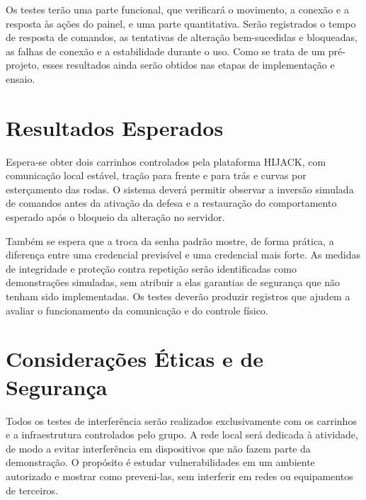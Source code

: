 \documentclass[12pt,a4paper]{article}
\begin{document}
Os testes terão uma parte funcional, que verificará o movimento, a
conexão e a resposta às ações do painel, e uma parte quantitativa. Serão
registrados o tempo de resposta de comandos, as tentativas de alteração
bem-sucedidas e bloqueadas, as falhas de conexão e a estabilidade durante
o uso. Como se trata de um pré-projeto, esses resultados ainda serão
obtidos nas etapas de implementação e ensaio.

\section{Resultados Esperados}
Espera-se obter dois carrinhos controlados pela plataforma HIJACK, com
comunicação local estável, tração para frente e para trás e curvas
por esterçamento das rodas.
O sistema deverá permitir observar a inversão simulada de comandos
antes da ativação da defesa e a restauração do comportamento esperado
após o bloqueio da alteração no servidor.

Também se espera que a troca da senha padrão mostre, de forma prática,
a diferença entre uma credencial previsível e uma credencial mais forte.
As medidas de integridade e proteção contra repetição serão identificadas
como demonstrações simuladas, sem atribuir a elas garantias de segurança
que não tenham sido implementadas. Os testes deverão produzir registros
que ajudem a avaliar o funcionamento da comunicação e do controle físico.

\section{Considerações Éticas e de Segurança}
Todos os testes de interferência serão realizados exclusivamente com os
carrinhos e a infraestrutura controlados pelo grupo. A rede local será dedicada à atividade, de modo a evitar interferência
em dispositivos que não fazem parte da demonstração. O propósito é estudar vulnerabilidades em um ambiente
autorizado e mostrar como preveni-las, sem interferir em redes ou
equipamentos de terceiros.
\end{document}
